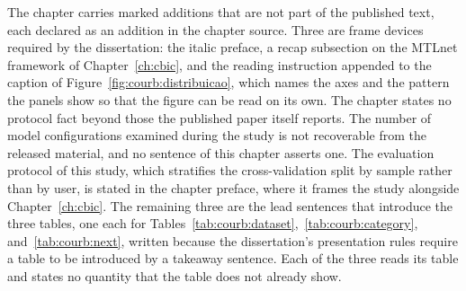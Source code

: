 The chapter carries marked additions that are not part of the published text, each
declared as an addition in the chapter source. Three are frame devices required by the
dissertation: the italic preface, a recap subsection on the MTLnet framework of
Chapter~\ref{ch:cbic}, and the reading instruction appended to the caption of
Figure~\ref{fig:courb:distribuicao}, which names the axes and the pattern the panels show
so that the figure can be read on its own. The chapter states no protocol fact beyond
those the published paper itself reports. The number of model
configurations examined during the study is not recoverable from the released material, and no
sentence of this chapter asserts one. The evaluation protocol of this study, which
stratifies the cross-validation split by sample rather than by user, is stated in the
chapter preface, where it frames the study alongside Chapter~\ref{ch:cbic}.
The remaining three are the lead sentences that introduce the three tables,
one each for Tables~\ref{tab:courb:dataset},~\ref{tab:courb:category},
and~\ref{tab:courb:next}, written because the dissertation's presentation rules require a
table to be introduced by a takeaway sentence. Each of the three reads its table and states
no quantity that the table does not already show.

